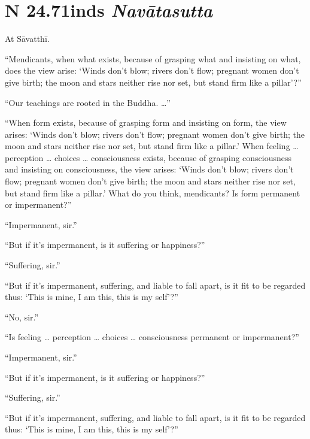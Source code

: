 \documentclass[12pt,openany]{book}%
\newcommand*{\suttatitleacronym}[1]{\smaller[2]{#1}\vspace*{.3em}}
\newcommand*{\suttatitletranslation}[1]{\linebreak{#1}}
\newcommand*{\suttatitleroot}[1]{\linebreak\smaller[2]\itshape{#1}}
\newcommand*{\tocacronym}[1]{\hspace*{-3.3em}{#1}\quad}
\newcommand*{\toctranslation}[1]{#1}
\newcommand*{\tocroot}[1]{(\textit{#1})}
\begin{document}
%
\section*{{\suttatitleacronym SN 24.71}{\suttatitletranslation Winds }{\suttatitleroot Navātasutta}}
\addcontentsline{toc}{section}{\tocacronym{SN 24.71} \toctranslation{Winds } \tocroot{Navātasutta}}

At \textsanskrit{Sāvatthī}. 

“Mendicants, when what exists, because of grasping what and insisting on what, does the view arise: ‘Winds don’t blow; rivers don’t flow; pregnant women don’t give birth; the moon and stars neither rise nor set, but stand firm like a pillar’?” 

“Our teachings are rooted in the Buddha. …” 

“When form exists, because of grasping form and insisting on form, the view arises: ‘Winds don’t blow; rivers don’t flow; pregnant women don’t give birth; the moon and stars neither rise nor set, but stand firm like a pillar.’ When feeling … perception … choices … consciousness exists, because of grasping consciousness and insisting on consciousness, the view arises: ‘Winds don’t blow; rivers don’t flow; pregnant women don’t give birth; the moon and stars neither rise nor set, but stand firm like a pillar.’ What do you think, mendicants? Is form permanent or impermanent?” 

“Impermanent, sir.” 

“But if it’s impermanent, is it suffering or happiness?” 

“Suffering, sir.” 

“But if it’s impermanent, suffering, and liable to fall apart, is it fit to be regarded thus: ‘This is mine, I am this, this is my self’?” 

“No, sir.” 

“Is feeling … perception … choices … consciousness permanent or impermanent?” 

“Impermanent, sir.” 

“But if it’s impermanent, is it suffering or happiness?” 

“Suffering, sir.” 

“But if it’s impermanent, suffering, and liable to fall apart, is it fit to be regarded thus: ‘This is mine, I am this, this is my self’?” 
\end{document}
